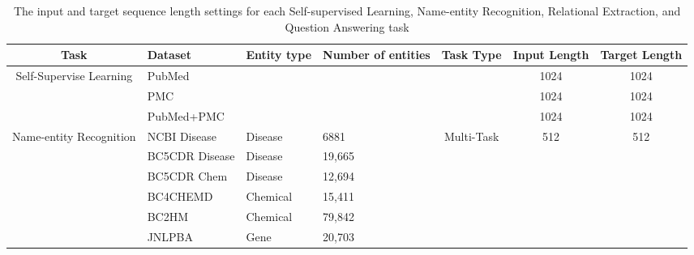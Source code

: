 \documentclass[nocrop]{bioinfo}
\begin{document}
\begin{methods}
\end{methods} \begin{table*}[]
\centering
\caption{The input and target sequence length settings for each Self-supervised Learning, Name-entity Recognition, Relational Extraction, and Question Answering task}

\begin{tabular}{@{}clllccc@{}}
\toprule
Task                                     & Dataset         & Entity type          & Number of entities   & Task Type                             & Input Length         & Target Length        \\ \midrule
\multirow{3}{*}{Self-Supervise Learning} & PubMed          & \multicolumn{1}{r}{} & \multicolumn{1}{r}{} & \multicolumn{1}{r}{\multirow{3}{*}{}} & 1024                 & 1024                 \\
                                         & PMC             & \multicolumn{1}{r}{} & \multicolumn{1}{r}{} & \multicolumn{1}{r}{}                  & 1024                 & 1024                 \\
                                         & PubMed+PMC      & \multicolumn{1}{r}{} & \multicolumn{1}{r}{} & \multicolumn{1}{r}{}                  & 1024                 & 1024                 \\ \midrule
\multirow{7}{*}{Name-entity Recognition} & NCBI Disease    & Disease              & 6881                 & \multirow{7}{*}{Multi-Task}           & \multirow{7}{*}{512} & \multirow{7}{*}{512} \\
                                         & BC5CDR Disease  & Disease              & 19,665               &                                       &                      &                      \\
                                         & BC5CDR Chem     & Disease              & 12,694               &                                       &                      &                      \\
                                         & BC4CHEMD        & Chemical                 & 15,411               &                                       &                      &                      \\
                                         & BC2HM           & Chemical                 & 79,842               &                                       &                      &                      \\
                                         & JNLPBA          & Gene                 & 20,703               &                                       &                      &                      \\

\end{tabular}
\end{table*}
\end{document}
